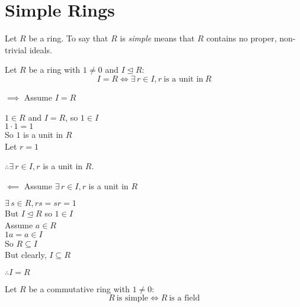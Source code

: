 \documentclass[letterpaper,12pt,fleqn]{article}
\newcommand{\ide}{\trianglelefteq}
\begin{document}
\section*{Simple Rings}

\begin{definition}[Simple]
  Let $R$ be a ring. To say that $R$ is \emph{simple} means that $R$ contains
  no proper, non-trivial ideals.
\end{definition}

\begin{theorem}
  Let $R$ be a ring with $1\ne0$ and $I\ide R$:
  \[I=R\iff\exists\,r\in I,r\ \mbox{is a unit in}\ R\]
\end{theorem}

\begin{theproof}
  \listbreak

  \begin{description}
  \item $\implies$ Assume $I=R$

    $1\in R$ and $I=R$, so $1\in I$ \\
    $1\cdot1=1$ \\
    So $1$ is a unit in $R$ \\
    Let $r=1$

    $\therefore\exists\,r\in I,r$ is a unit in $R$.

  \item $\impliedby$ Assume $\exists\,r\in I,r$ is a unit in $R$

    $\exists\,s\in R,rs=sr=1$ \\
    But $I\ide R$ so $1\in I$ \\
    Assume $a\in R$ \\
    $1a=a\in I$ \\
    So $R\subseteq I$ \\
    But clearly, $I\subseteq R$

    $\therefore I=R$
  \end{description}
\end{theproof}

\begin{theorem}
  Let $R$ be a commutative ring with $1\ne 0$:
  \[R\ \mbox{is simple}\iff R\ \mbox{is a field}\]
\end{theorem}
\end{document}
